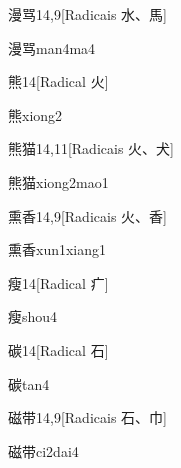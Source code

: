\begin{entry}{漫骂}{14,9}[Radicais ⽔、⾺]
  \begin{phonetics}{漫骂}{man4ma4}
  \end{phonetics}
\end{entry}

\begin{entry}{熊}{14}[Radical ⽕]
  \begin{phonetics}{熊}{xiong2}
  \end{phonetics}
\end{entry}

\begin{entry}{熊猫}{14,11}[Radicais ⽕、⽝]
  \begin{phonetics}{熊猫}{xiong2mao1}
  \end{phonetics}
\end{entry}

\begin{entry}{熏香}{14,9}[Radicais ⽕、⾹]
  \begin{phonetics}{熏香}{xun1xiang1}
  \end{phonetics}
\end{entry}

\begin{entry}{瘦}{14}[Radical ⽧]
  \begin{phonetics}{瘦}{shou4}
  \end{phonetics}
\end{entry}

\begin{entry}{碳}{14}[Radical ⽯]
  \begin{phonetics}{碳}{tan4}
  \end{phonetics}
\end{entry}

\begin{entry}{磁带}{14,9}[Radicais ⽯、⼱]
  \begin{phonetics}{磁带}{ci2dai4}
  \end{phonetics}
\end{entry}

